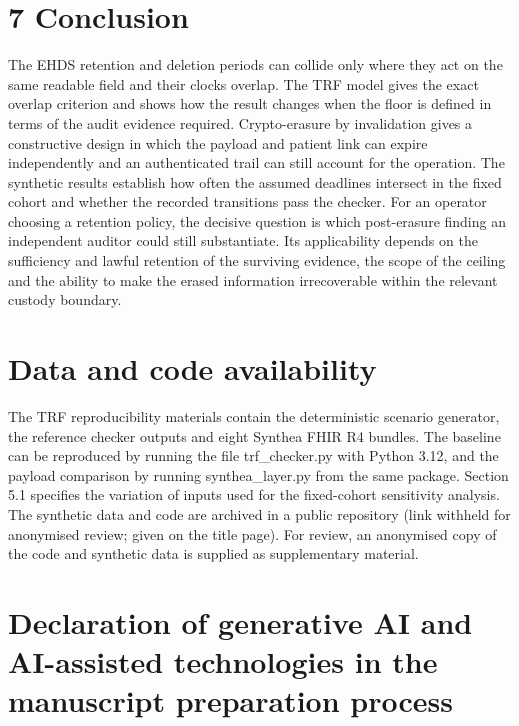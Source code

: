 \documentclass[5p,twocolumn]{elsarticle}
\begin{document}
\hypertarget{conclusion}{%
\section{7 Conclusion}\label{conclusion}}

The EHDS retention and deletion periods can collide only where they act
on the same readable field and their clocks overlap. The TRF model gives
the exact overlap criterion and shows how the result changes when the
floor is defined in terms of the audit evidence required. Crypto-erasure
by invalidation gives a constructive design in which the payload and
patient link can expire independently and an authenticated trail can
still account for the operation. The synthetic results establish how
often the assumed deadlines intersect in the fixed cohort and whether
the recorded transitions pass the checker. For an operator choosing a
retention policy, the decisive question is which post-erasure finding an
independent auditor could still substantiate. Its applicability depends
on the sufficiency and lawful retention of the surviving evidence, the
scope of the ceiling and the ability to make the erased information
irrecoverable within the relevant custody boundary.

\hypertarget{data-and-code-availability}{%
\section{Data and code availability}\label{data-and-code-availability}}

The TRF reproducibility materials contain the deterministic scenario
generator, the reference checker outputs and eight Synthea FHIR R4
bundles. The baseline can be reproduced by running the file
trf\_checker.py with Python 3.12, and the payload comparison by running
synthea\_layer.py from the same package. Section 5.1 specifies the
variation of inputs used for the fixed-cohort sensitivity analysis. The
synthetic data and code are archived in a public repository (link
withheld for anonymised review; given on the title page). For review, an
anonymised copy of the code and synthetic data is supplied as
supplementary material.

\hypertarget{declaration-of-generative-ai-and-ai-assisted-technologies-in-the-manuscript-preparation-process}{%
\section{Declaration of generative AI and AI-assisted technologies in
the manuscript preparation
process}\label{declaration-of-generative-ai-and-ai-assisted-technologies-in-the-manuscript-preparation-process}}
\end{document}
